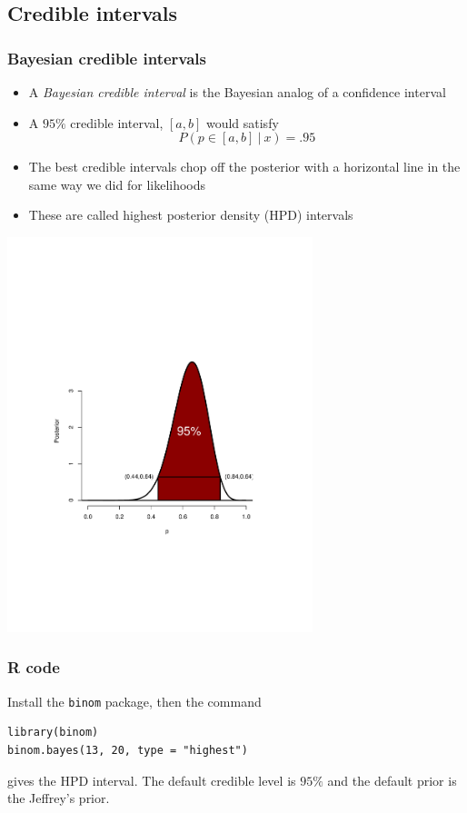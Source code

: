 \documentclass[aspectratio=169]{beamer}
\begin{document}
\subsection{Credible intervals}
\begin{frame}\frametitle{Bayesian credible intervals}
\begin{itemize}
\item A {\em Bayesian credible interval} is the  Bayesian analog of a confidence
  interval
\item A $95\%$ credible interval, $[a, b]$ would satisfy
  $$
  P(p \in [a, b] ~|~ x) = .95
  $$
\item The best credible intervals chop off the posterior with a horizontal
  line in the same way we did for likelihoods 
\item These are called highest posterior density (HPD) intervals
\end{itemize}
\end{frame}

\begin{frame}
\includegraphics[width=3.5in]{hpd.pdf}
\end{frame}


\begin{frame}[fragile]\frametitle{R code}
Install the \texttt{binom} package, then the command
\begin{verbatim}
library(binom)
binom.bayes(13, 20, type = "highest")
\end{verbatim}
gives the HPD interval. The default credible level is $95\%$ and
the default prior is the Jeffrey's prior.
\end{frame}
\end{document}
